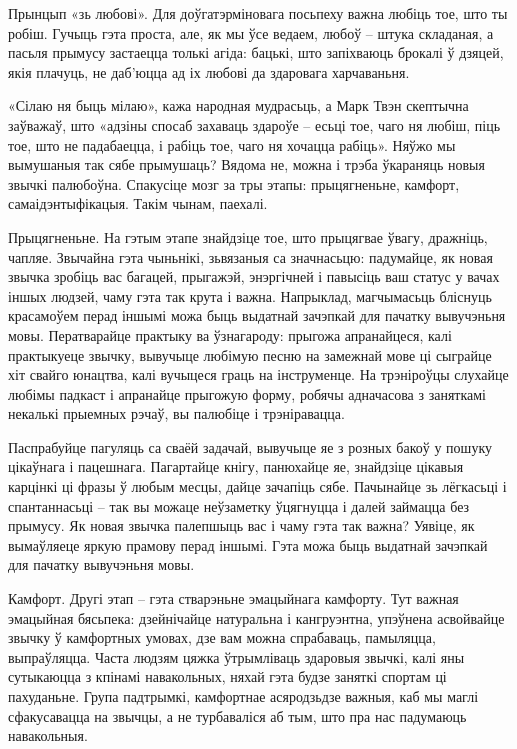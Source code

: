 Прынцып «зь любові». Для доўгатэрміновага посьпеху важна любіць тое, што ты робіш. Гучыць гэта проста, але, як мы ўсе ведаем, любоў – штука складаная, а пасьля прымусу застаецца толькі агіда: бацькі, што запіхваюць брокалі ў дзяцей, якія плачуць, не даб'юцца ад іх любові да здаровага харчаваньня.

«Сілаю ня быць мілаю», кажа народная мудрасьць, а Марк Твэн скептычна заўважаў, што «адзіны спосаб захаваць здароўе – есьці тое, чаго ня любіш, піць тое, што не падабаецца, і рабіць тое, чаго ня хочацца рабіць». Няўжо мы вымушаныя так сябе прымушаць? Вядома не, можна і трэба ўкараняць новыя звычкі палюбоўна. Спакусіце мозг за тры этапы: прыцягненьне, камфорт, самаідэнтыфікацыя. Такім чынам, паехалі.

Прыцягненьне. На гэтым этапе знайдзіце тое, што прыцягвае ўвагу, дражніць, чапляе. Звычайна гэта чыньнікі, зьвязаныя са значнасьцю: падумайце, як новая звычка зробіць вас багацей, прыгажэй, энэргічней і павысіць ваш статус у вачах іншых людзей, чаму гэта так крута і важна. Напрыклад, магчымасьць бліснуць красамоўем перад іншымі можа быць выдатнай зачэпкай для пачатку вывучэньня мовы. Ператварайце практыку ва ўзнагароду: прыгожа апранайцеся, калі практыкуеце звычку, вывучыце любімую песню на замежнай мове ці сыграйце хіт свайго юнацтва, калі вучыцеся граць на інструменце. На трэніроўцы слухайце любімы падкаст і апранайце прыгожую форму, робячы адначасова з заняткамі некалькі прыемных рэчаў, вы палюбіце і трэніравацца.

Паспрабуйце пагуляць са сваёй задачай, вывучыце яе з розных бакоў у пошуку цікаўнага і пацешнага. Пагартайце кнігу, панюхайце яе, знайдзіце цікавыя карцінкі ці фразы ў любым месцы, дайце зачапіць сябе. Пачынайце зь лёгкасьці і спантаннасьці – так вы можаце неўзаметку ўцягнуцца і далей займацца без прымусу. Як новая звычка палепшыць вас і чаму гэта так важна? Уявіце, як вымаўляеце яркую прамову перад іншымі. Гэта можа быць выдатнай зачэпкай для пачатку вывучэньня мовы.

Камфорт. Другі этап – гэта стварэньне эмацыйнага камфорту. Тут важная эмацыйная бясьпека: дзейнічайце натуральна і кангруэнтна, упэўнена асвойвайце звычку ў камфортных умовах, дзе вам можна спрабаваць, памыляцца, выпраўляцца. Часта людзям цяжка ўтрымліваць здаровыя звычкі, калі яны сутыкаюцца з кпінамі навакольных, няхай гэта будзе заняткі спортам ці пахуданьне. Група падтрымкі, камфортнае асяродзьдзе важныя, каб мы маглі сфакусавацца на звычцы, а не турбаваліся аб тым, што пра нас падумаюць навакольныя.


